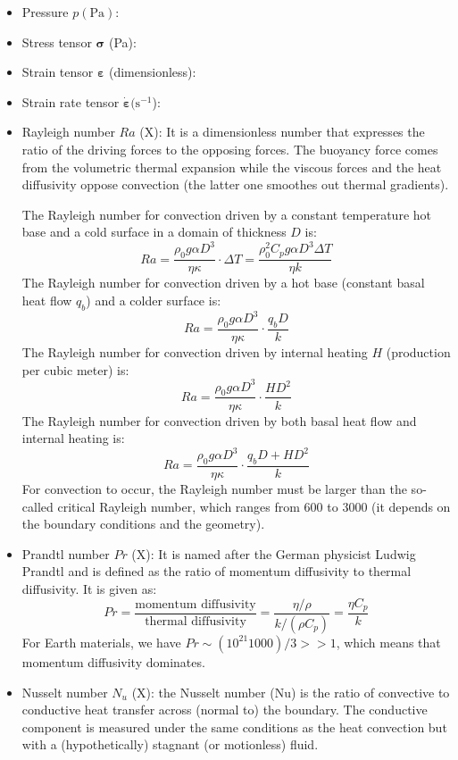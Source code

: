 \begin{itemize}
\item Pressure $p (\text{Pa})$:
\item Stress tensor ${\bm \sigma}$ (Pa): 
\item Strain tensor ${\bm \varepsilon}$ (dimensionless): 
\item Strain rate tensor $ \dot{\bm \varepsilon} (\text{s}^{-1}$): 
\item Rayleigh number $Ra$ (X): 
It is a dimensionless number that expresses the	ratio of the driving forces to the opposing forces.
The buoyancy force comes from the volumetric thermal expansion while the viscous forces and 
the heat diffusivity oppose convection (the latter one smoothes out thermal gradients). 

The Rayleigh number for convection driven by a constant temperature hot base and a cold surface
in a domain of thickness $D$ is:
\[
Ra 
= \frac{\rho_0 g \alpha D^3 }{\eta \kappa}  \cdot  \Delta T
= \frac{\rho_0^2 C_p g \alpha D^3 \Delta T}{\eta k}
\]
The Rayleigh number for convection driven by a hot base (constant basal heat flow $q_b$)
and a colder surface is:
\[
Ra = \frac{\rho_0 g \alpha D^3}{\eta \kappa } \cdot  \frac{q_b D}{k}
\]  
The Rayleigh number for convection driven by internal heating $H$ (production per cubic meter) is:
\[
Ra = \frac{\rho_0 g \alpha D^3}{\eta \kappa} \cdot  \frac{H D^2}{k }
\]
The Rayleigh number for convection driven by both basal heat flow and internal heating is:	
\[
Ra = \frac{\rho_0 g \alpha D^3}{\eta \kappa} \cdot  \frac{q_b D + H D^2}{k }
\]
For convection to occur, the Rayleigh number must be larger than the so-called critical 
Rayleigh number, which ranges from 600 to 3000 (it depends on the boundary conditions and the 
geometry).


\item Prandtl number $Pr$ (X):  It is named after the German physicist 
Ludwig Prandtl and is defined as the ratio of momentum diffusivity to thermal diffusivity. It is given as: 
\[
Pr = \frac{\text{momentum diffusivity}}{\text{thermal diffusivity}} = \frac{\eta/\rho}{k/(\rho C_p)}= \frac{\eta C_p}{k}
\]
For Earth materials, we have $Pr \sim (10^{21} 1000)/3 >> 1$, which means that momentum diffusivity dominates.


\item Nusselt number $N_u$ (X):   the Nusselt number (Nu) is the ratio of convective to conductive heat transfer across (normal to) the boundary. The conductive component is measured under the same conditions as the heat convection but with a (hypothetically) stagnant (or motionless) fluid.


\end{itemize}
